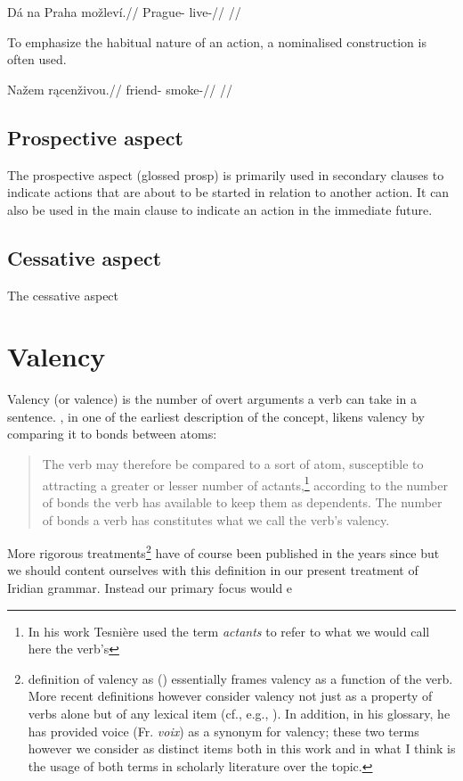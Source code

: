 \pex
\begingl
\gla Dá na Praha možleví.//
\glb {} \Loc{} Prague-\Acc{} live-//
\glft {} //
\endgl
\xe

To emphasize the habitual nature of an action, a nominalised construction is often used.

\pex
\begingl
\gla Nažem r\k{a}cenživou.//
\glb friend-\First{}\Sg{} smoke-//
\glft {} //
\endgl
\xe

\subsection{Prospective aspect}
\par The prospective aspect (glossed {\cscaps prosp}) is primarily used in secondary clauses to indicate actions that are about to be started in relation to another action. It can also be used in the main clause to indicate an action in the immediate future.

\subsection{Cessative aspect}
The cessative aspect

\section{Valency}

Valency (or valence) is the number of overt arguments a verb can take in a sentence. \textcite[239]{tesniere1965}, in one of the earliest description of the concept, likens valency by comparing it to bonds between atoms:
\begin{quotation}
	\small
The verb may therefore be compared to a sort of atom, susceptible to attracting a greater or lesser number of actants,\footnote{In his work Tesni\`ere used the term \emph{actants} to refer to what we would call here the verb's } according to the number of bonds the verb has available to keep them as dependents. The number of bonds a verb has constitutes what we call the verb's valency.
\end{quotation}

More rigorous treatments\footnote{ definition of valency as  () essentially frames valency as a function of the verb. More recent definitions however consider valency not just as a property of verbs alone but of any lexical item (cf., e.g., \cite{matthews1997,trask1993}). In addition, in his glossary, he has provided voice (Fr. \emph{voix}) as a synonym for valency; these two terms however we consider as distinct items both in this work and in what I think is the usage of both terms in scholarly literature over the topic.} have of course been published in the years since but we should content ourselves with this definition in our present treatment of Iridian grammar. Instead our primary focus would e

